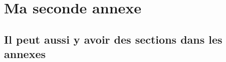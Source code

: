 \chapter{Ma seconde annexe}

\section{Il peut aussi y avoir des sections dans les annexes}
\blindtext[4]